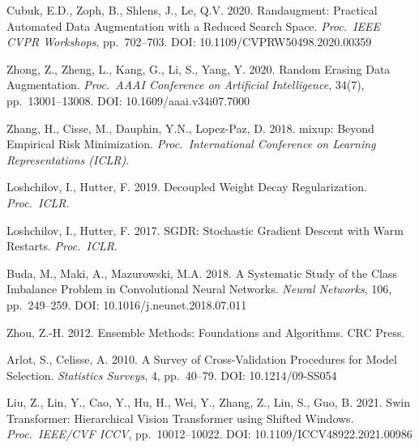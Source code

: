 \documentclass[9pt, a4paper, twocolumn]{article}
\begin{document}
\begin{sloppypar}
\begin{enumerate}[label={[\arabic*]}, leftmargin=*, itemsep=2pt, parsep=0pt, font=\small]
\item Cubuk, E.D., Zoph, B., Shlens, J., Le, Q.V. 2020. Randaugment: Practical Automated Data Augmentation with a Reduced Search Space. \textit{Proc.\ IEEE CVPR Workshops}, pp.~702--703. DOI: 10.1109/CVPRW50498.2020.00359

\item Zhong, Z., Zheng, L., Kang, G., Li, S., Yang, Y. 2020. Random Erasing Data Augmentation. \textit{Proc.\ AAAI Conference on Artificial Intelligence}, 34(7), pp.~13001--13008. DOI: 10.1609/aaai.v34i07.7000

\item Zhang, H., Cisse, M., Dauphin, Y.N., Lopez-Paz, D. 2018. mixup: Beyond Empirical Risk Minimization. \textit{Proc.\ International Conference on Learning Representations (ICLR)}.

\item Loshchilov, I., Hutter, F. 2019. Decoupled Weight Decay Regularization. \textit{Proc.\ ICLR}.

\item Loshchilov, I., Hutter, F. 2017. SGDR: Stochastic Gradient Descent with Warm Restarts. \textit{Proc.\ ICLR}.

\item Buda, M., Maki, A., Mazurowski, M.A. 2018. A Systematic Study of the Class Imbalance Problem in Convolutional Neural Networks. \textit{Neural Networks}, 106, pp.~249--259. DOI: 10.1016/j.neunet.2018.07.011

\item Zhou, Z.-H. 2012. Ensemble Methods: Foundations and Algorithms. CRC Press.

\item Arlot, S., Celisse, A. 2010. A Survey of Cross-Validation Procedures for Model Selection. \textit{Statistics Surveys}, 4, pp.~40--79. DOI: 10.1214/09-SS054

\item Liu, Z., Lin, Y., Cao, Y., Hu, H., Wei, Y., Zhang, Z., Lin, S., Guo, B. 2021. Swin Transformer: Hierarchical Vision Transformer using Shifted Windows. \textit{Proc.\ IEEE/CVF ICCV}, pp.~10012--10022. DOI: 10.1109/ICCV48922.2021.00986

\end{enumerate}
\end{sloppypar}
\end{document}
